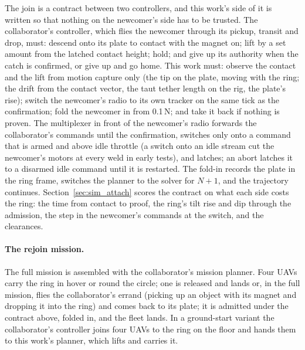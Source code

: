The join is a contract between two controllers, and this work's side of it is written so that nothing on the
newcomer's side has to be trusted. The collaborator's controller, which flies the newcomer through its pickup,
transit and drop, must: descend onto its plate to contact with the magnet on; lift by a set amount from the latched
contact height; hold; and give up its authority when the catch is confirmed, or give up and go home. This work
must: observe the contact and the lift from motion capture only (the tip on the plate, moving with the ring; the
drift from the contact vector, the taut tether length on the rig, the plate's rise); switch the newcomer's radio
to its own tracker on the same tick as the confirmation; fold the newcomer in from 0.1\,N; and take it back if
nothing is proven. The multiplexer in front of the newcomer's radio forwards the collaborator's commands until the
confirmation, switches only onto a command that is armed and above idle throttle (a switch onto an idle stream cut
the newcomer's motors at every weld in early tests), and latches; an abort latches it to a disarmed idle command
until it is restarted. The fold-in records the plate in the ring frame, switches the planner to the solver for
$N+1$, and the trajectory continues. Section~\ref{sec:sim_attach} scores the contract on what each side costs the
ring: the time from contact to proof, the ring's tilt rise and dip through the admission, the step in the
newcomer's commands at the switch, and the clearances.

\paragraph{The rejoin mission.} The full mission is assembled with the collaborator's mission planner. Four UAVs
carry the ring in hover or round the circle; one is released and lands or, in the full mission, flies the
collaborator's errand (picking up an object with its magnet and dropping it into the ring) and comes back to its
plate; it is admitted under the contract above, folded in, and the fleet lands. In a ground-start variant the
collaborator's controller joins four UAVs to the ring on the floor and hands them to this work's planner, which
lifts and carries it.

